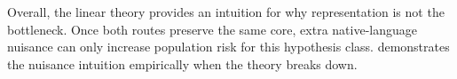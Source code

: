 Overall, the linear theory provides an intuition for why representation is not the bottleneck. Once both routes preserve the same core, extra native-language nuisance can only increase population risk for this hypothesis class.  demonstrates the nuisance intuition empirically when the theory breaks down.




